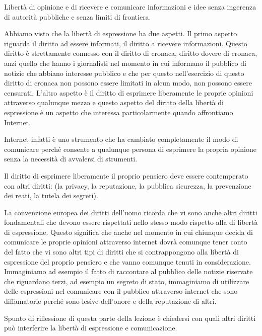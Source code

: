 Libertà di opinione e di ricevere e comunicare informazioni e idee senza ingerenza di autorità pubbliche e senza limiti di frontiera. \par

Abbiamo visto che la libertà di espressione ha due aspetti. Il primo aspetto riguarda il diritto ad essere informati, il diritto a ricevere informazioni. Questo diritto è strettamente connesso con il diritto di cronaca, diritto dovere di cronaca, anzi quello che hanno i giornalisti nel momento in cui informano il pubblico di notizie che abbiano interesse pubblico e che per questo nell'esercizio di questo diritto di cronaca non possono essere limitati in alcun modo, non possono essere censurati. L'altro aspetto è il diritto di esprimere liberamente le proprie opinioni attraverso qualunque mezzo e questo aspetto del diritto della libertà di espressione è un aspetto che interessa particolarmente quando affrontiamo Internet.\par
Internet infatti è uno strumento che ha cambiato completamente il modo di comunicare perché consente a qualunque persona di esprimere la propria opinione senza la necessità di avvalersi di strumenti. \par
Il diritto di esprimere liberamente il proprio pensiero deve essere contemperato con altri diritti: (la privacy, la reputazione, la pubblica sicurezza, la prevenzione dei reati, la tutela dei segreti).\par
La convenzione europea dei diritti dell'uomo ricorda che vi sono anche altri diritti fondamentali che devono essere rispettati nello stesso modo rispetto alla di libertà di espressione. Questo significa che anche nel momento in cui chiunque decida di comunicare le proprie opinioni attraverso internet dovrà comunque tener conto del fatto che vi sono altri tipi di diritti che si contrappongono alla libertà di espressione del proprio pensiero e che vanno comunque tenuti in considerazione. Immaginiamo ad esempio il fatto di raccontare al pubblico delle notizie riservate che riguardano terzi, ad esempio un segreto di stato, immaginiamo di utilizzare delle espressioni nel comunicare con il pubblico attraverso internet che sono diffamatorie perché sono lesive dell'onore e della reputazione di altri.\par
Spunto di riflessione di questa parte della lezione è chiedersi con quali altri diritti può interferire la libertà di espressione e comunicazione.

